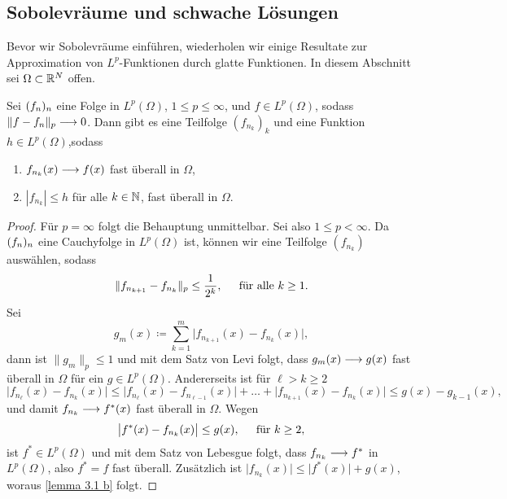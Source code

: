 \subsection{Sobolevräume und schwache Lösungen}
Bevor wir Sobolevräume einführen, wiederholen wir einige Resultate zur Approximation von \(L^p\)-Funktionen durch glatte Funktionen. In diesem Abschnitt sei \(\Omega\subset\mathbb{R}^N\) offen.
\begin{lem}\label{lem: glm konv von funktionenfolgen auf Lp}
	Sei \((f_n)_n\) eine Folge in \(L^p(\Omega)\), \(1\leq p\leq\infty\), und \(f\in L^p(\Omega)\), sodass \(\|f-f_n\|_p\longrightarrow0\). Dann gibt es eine Teilfolge \((f_{n_k})_k\) und eine Funktion \(h\in L^p(\Omega)\),sodass
	\begin{enumerate}[label=(\alph*)]
		\item \(f_{n_k}(x)\longrightarrow f(x)\) fast überall in \(\Omega\),
		\item\label{lemma 3.1 b} \(|f_{n_k}|\leq h\) für alle \(k\in\mathbb{N}\), fast überall in \(\Omega\).
	\end{enumerate}
\end{lem}
\begin{proof}
	Für \(p=\infty\) folgt die Behauptung unmittelbar. Sei also \(1\leq p<\infty\). Da \((f_n)_n\) eine Cauchyfolge in \(L^p(\Omega)\) ist, können wir eine Teilfolge \((f_{n_k})\) auswählen, sodass
	\begin{equation*}
		\|f_{n_{k+1}}-f_{n_k}\|_p\leq\frac{1}{2^k},\;\;\;\;\text{ für alle }k\geq1.
	\end{equation*}
	Sei
	\begin{equation*}
		g_m(x)\coloneqq\sum_{k=1}^m\big|f_{n_{k+1}}(x)-f_{n_k}(x)\big|,
	\end{equation*}
	dann ist \(\|g_m\|_p\leq1\) und mit dem Satz von Levi folgt, dass \(g_m(x)\longrightarrow g(x)\) fast überall in \(\Omega\) für ein \(g\in L^p(\Omega)\). Andererseits ist für \(\ell> k\geq 2\)
	\begin{equation*}
		\big|f_{n_\ell}(x)-f_{n_k}(x)\big|
		\leq\big|f_{n_\ell}(x)-f_{n_{\ell-1}}(x)\big|+\ldots+\big|f_{n_{k+1}}(x)-f_{n_k}(x)\big|\leq g(x)-g_{k-1}(x),
	\end{equation*}
	und damit \(f_{n_k}\longrightarrow f^\ast(x)\) fast überall in \(\Omega\). Wegen
	\begin{equation*}
		\big|f^\ast(x)-f_{n_k}(x)\big|\leq g(x),\;\;\;\;\text{ für }k\geq 2,
	\end{equation*}
	ist \(f^\ast\in L^p(\Omega)\) und mit dem Satz von Lebesgue folgt, dass \(f_{n_k}\longrightarrow f^\ast\) in \(L^p(\Omega)\), also \(f^\ast=f\) fast überall. Zusätzlich ist \(\big|f_{n_k}(x)\big|\leq\big|f^\ast(x)\big|+g(x)\), woraus \ref{lemma 3.1 b} folgt.
\end{proof}
